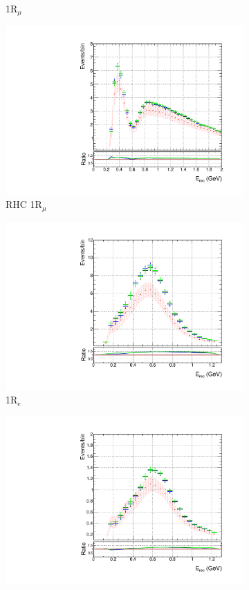 \begin{figure}[!htbp]
\begin{subfigure}{.49\textwidth}
  \caption{1R$_{\mu}$}
  \label{fig:skppnumu}
\end{subfigure}
\begin{subfigure}{.49\textwidth}
  \centering
  \includegraphics[width=0.95\linewidth]{figs/polySKnumubar}
   \caption{RHC 1R$_{\mu}$}
  \label{fig:skppnumubar}
\end{subfigure}
\begin{subfigure}{.49\textwidth}
  \centering
  \includegraphics[width=0.95\linewidth]{figs/polySKnue}
  \caption{1R$_{e}$}
  \label{fig:skppnue}
\end{subfigure}
\begin{subfigure}{.49\textwidth}
  \centering
  \includegraphics[width=0.95\linewidth]{figs/polySKnuebar}

\end{subfigure}
\end{figure}
